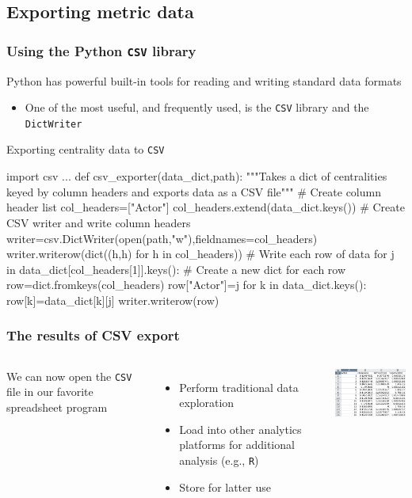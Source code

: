 \documentclass[xcolor=dvipsnames, 9pt]{beamer}
\newenvironment{code}{\begin{semiverbatim} \begin{footnotesize}}
{\end{footnotesize}\end{semiverbatim}}
\begin{document}

\subsection{Exporting metric data} %
\label{sub:exporting_metric_data}

\begin{frame}[fragile]
    \frametitle{Using the Python \texttt{CSV} library}
    Python has powerful built-in tools for reading and writing standard data formats
    \begin{itemize}
        \item One of the most useful, and frequently used, is the \texttt{CSV} library and the \texttt{DictWriter}
    \end{itemize}
    \begin{block}{Exporting centrality data to \texttt{CSV}}
        \begin{code}
\scriptsize{\alert<2>{import csv}
...
def csv_exporter(\alert<3>{data_dict,path}):
    """Takes a dict of centralities keyed by column headers and exports 
    data as a CSV file"""
    \alert<4>{# Create column header list
    col_headers=["Actor"]
    col_headers.extend(data_dict.keys())}
    \alert<5>{# Create CSV writer and write column headers
    writer=csv.DictWriter(open(path,"w"),fieldnames=col_headers)
    writer.writerow(dict((h,h) for h in col_headers))}
    \alert<6>{# Write each row of data
    for j in data_dict[col_headers[1]].keys():}
        \alert<7>{# Create a new dict for each row
        row=dict.fromkeys(col_headers)
        row["Actor"]=j
        for k in data_dict.keys():
            row[k]=data_dict[k][j]
        writer.writerow(row)}}
        \end{code}
    \end{block}
\end{frame}

\begin{frame}[fragile]
    \frametitle{The results of CSV export}
    \begin{columns}
        We can now open the \texttt{CSV} file in our favorite spreadsheet program
        \begin{itemize}
            \item Perform traditional data exploration
            \item Load into other analytics platforms for additional analysis (e.g., \texttt{R})
            \item Store for latter use
        \end{itemize}
        \includegraphics[width=5.5cm]{../images/figures/metrics_screen_shot.png}
    \end{columns}
\end{frame}
\end{document}
